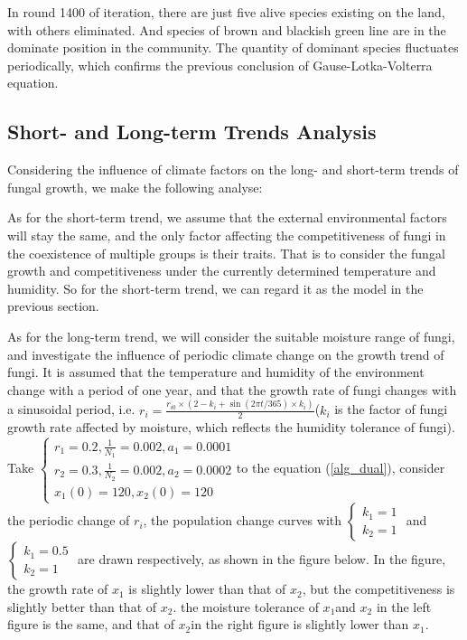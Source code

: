 \documentclass{mcmthesis}
\begin{document}
In round 1400 of iteration, there are just five alive species existing on the land, with others eliminated. And species of brown and blackish green line are in the dominate position in the community. The quantity of dominant species fluctuates periodically, which confirms the previous conclusion of  Gause-Lotka-Volterra equation.

\subsection{Short- and Long-term Trends Analysis}

Considering the influence of climate factors on the long- and short-term trends of fungal growth, we make the following analyse: 

As for the short-term trend, we assume that the external environmental factors will stay the same, and the only factor affecting the competitiveness of fungi in the coexistence of multiple groups is their traits. That is to consider the fungal growth and competitiveness under the currently determined temperature and humidity. So for the short-term trend, we can regard it as the model in the previous section.

As for the long-term trend, we will consider the suitable moisture range of fungi, and investigate the influence of periodic climate change on the growth trend of fungi. It is assumed that the temperature and humidity of the environment change with a period of one year, and that the growth rate of fungi changes with a sinusoidal period, i.e. $ r_i = \frac {r_{i0} \times (2-k_i + \sin(2\pi t/365)\times k_i ) }{2} $($ k_i $ is the factor of fungi growth rate affected by moisture, which reflects the humidity tolerance of fungi). Take $ \left\{\begin{array}{l}
    r_{1}=0.2, \frac{1}{N_{1}}=0.002, a_{1}=0.0001 \\
    r_{2}=0.3, \frac{1}{N_{2}}=0.002, a_{2}=0.0002 \\
    x_{1}(0)=120, x_{2}(0)=120
    \end{array}\right. $to the equation (\ref{alg_dual}), consider the periodic change of $ r_i $,  the population change curves with $ \left\{\begin{array}{l}
    k_{1}=1 \\
    k_{2}=1
    \end{array}\right. $ and $ \left\{\begin{array}{l}
    k_{1}=0.5 \\
    k_{2}=1
    \end{array}\right. $ are drawn respectively, as shown in the figure below. In the figure, the growth rate of $ x_1 $ is slightly lower than that of $ x_2 $, but the competitiveness is slightly better than that of $ x_2 $. the moisture tolerance of $ x_1 $and $ x_2 $ in the left figure is the same, and that of $ x_2 $in the right figure is slightly lower than $ x_1 $.
\end{document}
